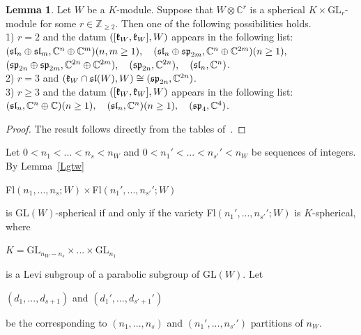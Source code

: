 \documentclass[12pt]{amsart}
\theoremstyle{definition}\newtheorem{theorem}{Theorem}[section]
\newtheorem{lemma}[proposition]{Lemma}
\theoremstyle{definition}\newtheorem{definition}[proposition]{Definition}
\theoremstyle{remark}\newtheorem{example}[proposition]{Example}
\begin{document}
\begin{lemma} Let $W$ be a $K$-module. Suppose that $W\otimes\mathbb C^r$ is a spherical $K\times$GL$_r$-module for some $r\in\mathbb Z_{\ge2}$. Then one of the following possibilities holds.\\1) $r=2$ and the datum $([\frak k_W, \frak k_W], W)$ appears in the following list:\\$(\frak{sl}_n\oplus\frak{sl}_m,\mathbb C^n\oplus\mathbb C^m) (n,m\ge 1),\hspace{10pt} (\frak{sl}_n\oplus\frak{sp}_{2m}, \mathbb C^n\oplus\mathbb C^{2m}) (n\ge 1),$\\$(\frak{sp}_{2n}\oplus\frak{sp}_{2m}, \mathbb C^{2n}\oplus\mathbb C^{2m}),\hspace{10pt} (\frak{sp}_{2n}, \mathbb C^{2n}),\hspace{10pt}(\frak{sl}_n,\mathbb C^n)$.\\2) $r=3$ and $(\frak k_W\cap\frak{sl}(W), W)\cong(\frak{sp}_{2n}, \mathbb C^{2n})$.\\3) $r\ge 3$ and the datum $([\frak k_W, \frak k_W], W)$ appears in the following list:\\ $(\frak{sl}_n, \mathbb C^n\oplus\mathbb C) (n \ge 1),\hspace{10pt}(\frak{sl}_n,\mathbb C^n) (n\ge 1), \hspace{10pt} (\frak{sp}_4, \mathbb C^4)$.\end{lemma}
\begin{proof}The result follows directly from the tables of~\cite{BR}.\end{proof}
Let $0<n_1<...< n_s<n_W$ and $0<n_1'<...<n_{s'}'<n_W$ be sequences of integers. By Lemma~\ref{Lgtw} \begin{center}Fl$(n_1, ..., n_s; W)\times$Fl$(n_1',..., n_{s'}'; W)$\end{center} is GL$(W)$-spherical if and only if the variety Fl$(n_1',..., n_{s'}'; W)$ is $K$-spherical, where \begin{center}$K=$GL$_{n_W-n_s}\times...\times$GL$_{n_1}$\end{center} is a Levi subgroup of a parabolic subgroup of GL$(W)$. Let \begin{center}$(d_1,..., d_{s+1})$ and $(d_1',..., d_{s'+1}')$\end{center} be the corresponding to $(n_1,..., n_s)$ and $(n_1',..., n_{s'}')$ partitions of $n_W$.
\end{document}
